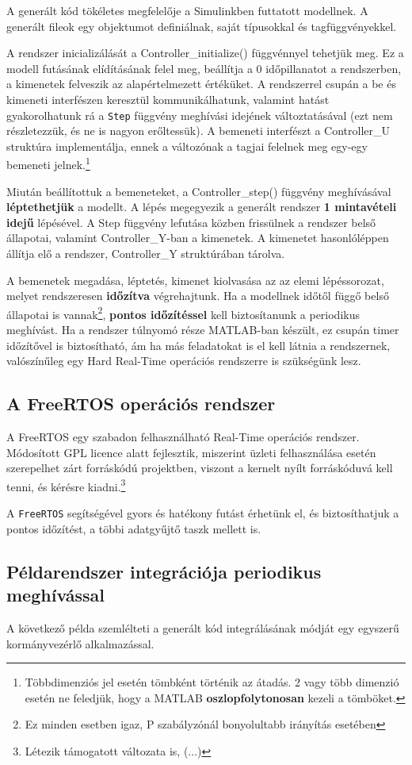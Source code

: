 A generált kód tökéletes megfelelője a Simulinkben futtatott modellnek. A generált fileok egy objektumot definiálnak, saját típusokkal és tagfüggvényekkel.

A rendszer inicializálását a Controller\_initialize() függvénnyel tehetjük meg. Ez a modell futásának elídításának felel meg, beállítja a 0 időpillanatot a rendszerben, a kimenetek felveszik az alapértelmezett értéküket.
A rendszerrel csupán a be és kimeneti interfészen keresztül kommunikálhatunk, valamint hatást gyakorolhatunk rá a \verb!Step! függvény meghívási idejének változtatásával (ezt nem részletezzük, és ne is nagyon erőltessük).
A bemeneti interfészt a Controller\_U struktúra implementálja, ennek a változónak a tagjai felelnek meg egy-egy bemeneti jelnek.\footnote{Többdimenziós jel esetén tömbként történik az átadás. 2 vagy több dimenzió esetén ne feledjük, hogy a MATLAB \textbf{oszlopfolytonosan} kezeli a tömböket.}

Miután beállítottuk a bemeneteket, a Controller\_step() függvény meghívásával \textbf{léptethetjük} a modellt. A lépés megegyezik a generált rendszer \textbf{1 mintavételi idejű} lépésével. A Step függvény lefutása közben frissülnek a rendszer belső állapotai, valamint Controller\_Y-ban a kimenetek. A kimenetet hasonlóléppen állítja elő a rendszer, Controller\_Y struktúrában tárolva.

A bemenetek megadása, léptetés, kimenet kiolvasása az az elemi lépéssorozat, melyet rendszeresen \textbf{időzítva} végrehajtunk. Ha a modellnek időtől függő belső állapotai is vannak\footnote{Ez minden esetben igaz, P szabályzónál bonyolultabb irányítás esetében}, \textbf{pontos időzítéssel} kell biztosítanunk a periodikus meghívást. Ha a rendszer túlnyomó része MATLAB-ban készült, ez csupán timer időzítővel is biztosítható, ám ha más feladatokat is el kell látnia a rendszernek, valószínűleg egy Hard Real-Time operációs rendszerre is szükségünk lesz.

\subsection{A FreeRTOS operációs rendszer}

A FreeRTOS egy szabadon felhasználható Real-Time operációs rendszer. Módosított GPL licence alatt fejlesztik, miszerint üzleti felhasználása esetén szerepelhet zárt forráskódú projektben, viszont a kernelt nyílt forráskóduvá kell tenni, és kérésre kiadni.\footnote{Létezik támogatott változata is, (...)}

A \verb!FreeRTOS! segítségével gyors és hatékony futást érhetünk el, és biztosíthatjuk a pontos időzítést, a többi adatgyűjtő taszk mellett is.

\subsection{Példarendszer integrációja periodikus meghívással}

A következő példa szemlélteti a generált kód integrálásának módját egy egyszerű kormányvezérlő alkalmazással.